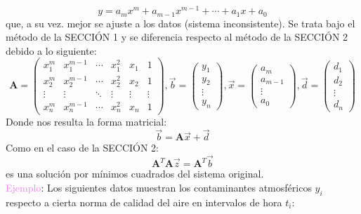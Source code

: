 \documentclass[11pt]{article}
\theoremstyle{definition}
\begin{document}
\begin{enumerate}[(i)]
\begin{equation*}
y = a_{m}x^{m} + a_{m-1}x^{m-1} + \cdots + a_{1}x + a_{0}
\end{equation*}
que, a su vez. mejor se ajuste a los datos (sistema inconsistente). 
Se trata bajo el m\'etodo de la SECCI\'ON 1 y se diferencia respecto al m\'etodo de la SECCI\'ON 2 debido a lo siguiente:
\begin{equation*}
\textbf{A} =
\begin{pmatrix}
x_{1}^{m} & x_{1}^{m - 1} & \cdots & x_{1}^{2} & x_{1} & 1\\
x_{2}^{m} & x_{2}^{m - 1} & \cdots & x_{2}^{2} & x_{2} & 1\\
\vdots & \vdots & \ddots & \vdots & \vdots & \vdots\\
x_{n}^{m} & x_{n}^{m - 1} & \cdots & x_{n}^{2} & x_{n} & 1
\end{pmatrix}, 
\vec{b} =
\begin{pmatrix}
y_{1}\\
y_{2}\\
\vdots\\
y_{n}
\end{pmatrix}, 
\vec{x} =
\begin{pmatrix}
a_{m}\\
a_{m - 1}\\
\vdots\\
a_{0}
\end{pmatrix}, 
\vec{d} =
\begin{pmatrix}
d_{1}\\
d_{2}\\
\vdots\\
d_{n}
\end{pmatrix}
\end{equation*}
Donde nos resulta la forma matricial:
\begin{equation*}
\vec{b} = \textbf{A}\vec{x} + \vec{d}
\end{equation*}
Como en el caso de la SECCI\'ON 2:
\begin{equation*}
\textbf{A}^{T}\textbf{A}\vec{z} = \textbf{A}^{T}\vec{b}
\end{equation*}
es una soluci\'on por m\'inimos cuadrados del sistema original.\\
\vspace{2mm} %
\textcolor{violet}{Ejemplo}: Los siguientes datos muestran los contaminantes atmosf\'ericos $y_{i}$ respecto a cierta norma de calidad del aire en intervalos de hora $t_{i}$:
\begin{table}[ht]
\centering

\end{table}
\end{enumerate}
\end{document}
